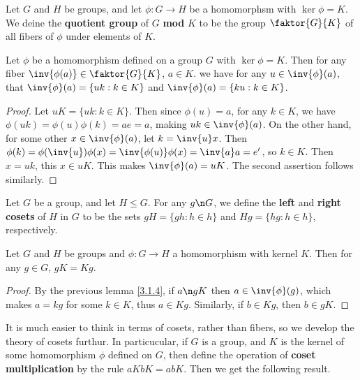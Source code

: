 \begin{definition}
    Let $G$ and  $H$ be groups, and let  $\phi:G \rightarrow H$ be a homomorphsm
    with $\ker{\phi}=K$. We deine the \textbf{quotient group} of $G$
    \textbf{mod} $K$ to be the group $\faktor{G}{K}$ of all fibers of $\phi$
    under elements of $K$.
\end{definition}

\begin{lemma}\label{3.1.4}
    Let $\phi$ be a homomorphism defined on a group  $G$ with  $\ker{\phi}=K$.
    Then for any fiber $\inv{\phi(a)} \in \faktor{G}{K}$, $a \in K$. we have
    for any $u \in \inv{\phi}(a)$, that $\inv{\phi}(a)=\{uk : k \in K\}$ and
    $\inv{\phi}(a)=\{ku : k \in K\}$.
\end{lemma}
\begin{proof}
    Let $uK=\{uk : k \in K\}$. Then since $\phi(u)=a$, for any $k \in K$, we
    have  $\phi(uk)=\phi(u)\phi(k)=ae=a$, making $uk \in \inv {\phi}(a)$. On the
    other hand, for some other $x \in \inv{\phi}(a)$, let $k=\inv{u}x$. Then
     $\phi(k)=\phi(\inv{u})\phi(x)=\inv{\phi(u)}\phi(x)=\inv{a}a=e'$, so $k \in
     K$. Then  $x=uk$, this  $x \in uK$. This makes  $\inv{\phi}(a)=uK$. The
     second assertion follows similarly.
\end{proof}

\begin{definition}
    Let $G$ be a group, and let  $H \leq G$. For any  $g \n G$, we define the
     \textbf{left} and \textbf{right cosets} of $H$ in $G$ to be the sets
     $gH=\{gh : h \in h\}$ and $Hg=\{hg : h \in h\}$, respectively.
\end{definition}

\begin{lemma}\label{3.1.5}
    Let $G$ and  $H$ be groups and  $\phi:G \rightarrow H$ a homomorphism with
    kernel $K$. Then for any  $g \in G$,  $gK=Kg$.
\end{lemma}
\begin{proof}
    By the previous lemma \ref{3.1.4}, if $a \n gK$ then  $a \in \inv{\phi}(g)$,
    which makes $a=kg$ for some  $k \in K$, thus  $a \in Kg$. Similarly, if  $b
    \in Kg$, then  $b \in gK$.
\end{proof}

It is much easier to think in terms of cosets, rather than fibers, so we develop
the theory of cosets furthur. In particucular, if $G$ is a group, and  $K$ is
the kernel of some homomorphism  $\phi$ defined on  $G$, then define the
operation of  \textbf{coset multiplication} by the rule $aKbK=abK$. Then we get
the following result.

